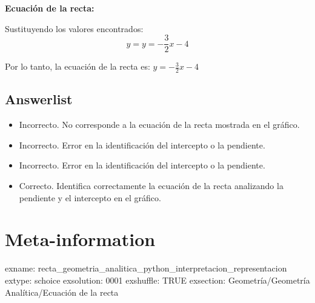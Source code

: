 \documentclass[
]{article}
\providecommand{\tightlist}{%
  \setlength{\itemsep}{0pt}\setlength{\parskip}{0pt}}
\begin{document}
\textbf{Ecuación de la recta:}

Sustituyendo los valores encontrados: \[y = y = -\frac{3}{2}x - 4\]

Por lo tanto, la ecuación de la recta es:
\textbf{\(y = -\frac{3}{2}x - 4\)}

\subsection{Answerlist}\label{answerlist-1}

\begin{itemize}
\tightlist
\item
  Incorrecto. No corresponde a la ecuación de la recta mostrada en el
  gráfico.
\item
  Incorrecto. Error en la identificación del intercepto o la pendiente.
\item
  Incorrecto. Error en la identificación del intercepto o la pendiente.
\item
  Correcto. Identifica correctamente la ecuación de la recta analizando
  la pendiente y el intercepto en el gráfico.
\end{itemize}

\section{Meta-information}\label{meta-information}

exname:
recta\_geometria\_analitica\_python\_interpretacion\_representacion
extype: schoice exsolution: 0001 exshuffle: TRUE exsection:
Geometría/Geometría Analítica/Ecuación de la recta
\end{document}

